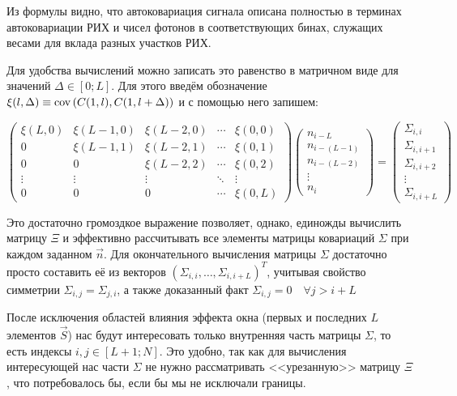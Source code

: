 Из формулы видно, что автоковариация сигнала описана полностью в терминах автоковариации РИХ и чисел фотонов в соответствующих бинах, служащих весами для вклада разных участков РИХ.

Для удобства вычислений можно записать это равенство в матричном виде для значений $\Delta \in \left[0; L\right]$. Для этого введём обозначение $\xi(l, \Delta) \equiv \mathrm{cov}\left(C(1, l), C(1, l + \Delta)\right)$ и с помощью него запишем:

\begin{equation}
	\begin{pmatrix} 
		\xi(L, 0) & \xi(L-1, 0) & \xi(L-2, 0) & \dotsm & \xi(0, 0) \\
		0    & \xi(L-1, 1) & \xi(L-2, 1) & \dotsm & \xi(0, 1) \\
		0    &      0      & \xi(L-2, 2) & \dotsm & \xi(0, 2) \\
		\vdots &   \vdots    &    \vdots   & \ddots &   \vdots  \\
		0    &      0      &      0      & \dotsm & \xi(0, L)
	\end{pmatrix}
	\begin{pmatrix} 
		n_{i-L} \\ n_{i-(L-1)} \\ n_{i-(L-2)} \\ \vdots \\ n_{i}
	\end{pmatrix}
	=
	\begin{pmatrix} 
		\Sigma_{i, i} \\
		\Sigma_{i, i+1} \\ 
		\Sigma_{i, i+2} \\ 
		\vdots \\ 
		\Sigma_{i, i+L}
	\end{pmatrix}
	\label{eq:Xi-matrix-for-Sigma-calculation}
\end{equation}

Это достаточно громоздкое выражение позволяет, однако, единожды вычислить матрицу $\Xi$ и эффективно рассчитывать все элементы матрицы ковариаций $\Sigma$ при каждом заданном $\vec{n}$. Для окончательного вычисления матрицы $\Sigma$ достаточно просто составить её из векторов $\left( \Sigma_{i, i}, \dots, \Sigma_{i, i+L} \right)^T$, учитывая свойство симметрии $\Sigma_{i, j} = \Sigma_{j, i}$, а также доказанный факт $\Sigma_{i, j} = 0 \quad \forall j > i + L$

После исключения областей влияния эффекта окна (первых и последних $L$ элементов $\vec{S}$) нас будут интересовать только внутренняя часть матрицы $\Sigma$, то есть индексы $i, j \in [L + 1; N]$. Это удобно, так как для вычисления интересующей нас части $\Sigma$ не нужно рассматривать <<урезанную>> матрицу $\Xi$, что потребовалось бы, если бы мы не исключали границы.


